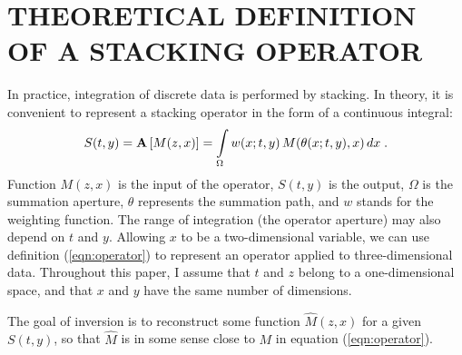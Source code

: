 
\section{THEORETICAL DEFINITION OF A STACKING OPERATOR}

In practice, integration of discrete data is performed by stacking.
In theory, it is convenient to
represent a stacking operator in the form of a continuous integral:
\begin{equation}
S(t,y)= {\bf A}\left[M(z,x)\right]= 
\int\limits_{\Omega} w(x;t,y)\,M(\theta(x;t,y),x)\,dx\;.
\label{eqn:operator}
\end{equation} 
Function $M(z,x)$ is the input of the operator, $S(t,y)$ is the
output, $\Omega$ is the summation aperture, 
$\theta$ represents the summation path, and $w$ stands for the
weighting function. The range of integration (the
operator aperture) may also depend on $t$ and $y$.  Allowing $x$ to be
a two-dimensional variable, we can use definition (\ref{eqn:operator}) to
represent an operator applied to three-dimensional data. Throughout
this paper, I assume that $t$ and $z$ belong to a one-dimensional
space, and that $x$ and $y$ have the same number of dimensions.
\par
The goal of inversion is to reconstruct some function
$\widehat{M}(z,x)$ for a given $S(t,y)$, so that $\widehat{M}$ is in some
 sense close to $M$ in equation (\ref{eqn:operator}).
